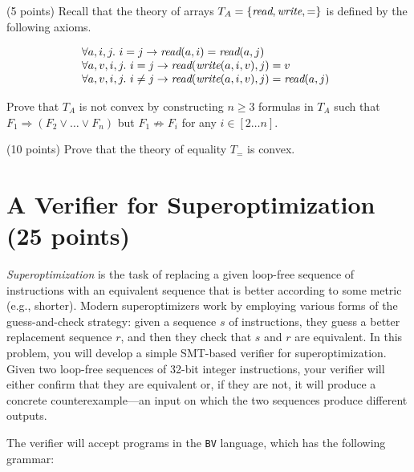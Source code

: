 \documentclass{handout}
\begin{document}
\begin{questions}
\begin{enumerate}
\end{enumerate}

\item (5 points) Recall that the theory of arrays $T_A =
\{\emph{read},\emph{write},=\}$ is defined by the following axioms.

\[
\begin{array}{@{}l}
\forall a,i,j. \ i = j \rightarrow \emph{read}(a, i) = \emph{read}(a, j)\\
\forall a,v,i,j. \ i = j \rightarrow \emph{read}(\emph{write}(a, i, v), j) = v\\
\forall a,v,i,j. \ i \neq j \rightarrow \emph{read}(\emph{write}(a, i, v), j) = \emph{read}(a, j)\\
\end{array}
\]

Prove that $T_A$ is not convex by constructing $n\geq 3$ formulas in $T_A$ such
that $F_1 \Rightarrow (F_2 \vee\ldots \vee F_n)$ but $F_1 \not\Rightarrow F_i$
for any $i \in [2\ldots n]$.




\item (10 points) \label{prob:smt:last} Prove that the theory of equality $T_=$
is convex.





\end{questions}



\section{A Verifier for Superoptimization (25 points)}

\emph{Superoptimization} is the task of replacing a given loop-free sequence of
instructions with an equivalent sequence that is better according to some metric
(e.g., shorter).  Modern superoptimizers work by employing various forms of the
guess-and-check strategy:  given a sequence $s$ of instructions, they guess a
better replacement sequence $r$, and then they check that $s$ and $r$ are
equivalent.  In this problem, you will develop a simple SMT-based verifier for
superoptimization.  Given two loop-free sequences of 32-bit integer
instructions, your verifier will either confirm that they are equivalent or, if
they are not, it will produce a concrete counterexample---an input on which the
two sequences produce different outputs.

The verifier will accept programs in the \texttt{BV} language, which has the
following grammar:
\end{document}
